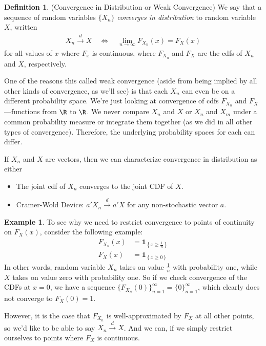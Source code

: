 \documentclass[12pt]{article}
\theoremstyle{plain}
\theoremstyle{definition}
\newtheorem{defn}[thm]{Definition}
\newtheorem{ex}[thm]{Example}
\theoremstyle{remark}
\newcommand{\one}[1]{\mathbf{1}_{#1}}
\newcommand{\dto}{\xrightarrow{d}}
\newcommand{\limn}{\lim_{n\rightarrow\infty}}
\begin{document}
\begin{defn}{(Convergence in Distribution or Weak Convergence)}
\label{defn:convergeInDistribution}
We say that a sequence of random variables $\{X_n\}$
\emph{converges in distribution} to random variable $X$, written
\begin{align*}
  X_n\dto X
  \quad\iff\quad
  \limn F_{X_n}(x) = F_X(x)
\end{align*}
for all values of $x$ where $F_x$ is continuous,
where $F_{X_n}$ and $F_X$ are the cdfs of $X_n$ and $X$, respectively.

One of the reasons this called weak convergence (aside from being
implied by all other kinds of convergence, as we'll see) is that each
$X_n$ can even be on a different probability space. We're just looking
at convergence of cdfs $F_{X_n}$ and $F_X$---functions from $\R$ to
$\R$.  We never compare $X_n$ and $X$ or $X_n$ and $X_m$ under a common
probability measure or integrate them together (as we did in all other
types of convergence). Therefore, the underlying probability spaces for
each can differ.

If $X_n$ and $X$ are vectors, then we can characterize convergence
in distribution as either
\begin{itemize}
  \item The joint cdf of $X_n$ converges to the joint CDF of $X$.
  \item Cramer-Wold Device: $a'X_n \dto a'X$ for any non-stochastic
    vector $a$.
\end{itemize}
\end{defn}
\begin{ex}
To see why we need to restrict convergence to points of continuity on
$F_X(x)$, consider the following example:
\begin{align*}
  F_{X_n}(x) &= \one{\left\{x\geq \frac{1}{n}\right\}}\\
  F_{X}(x) &= \one{\left\{x\geq 0\right\}}
\end{align*} In other words, random variable $X_n$ takes on value
$\frac{1}{n}$ with probability one, while $X$ takes on value zero with
probability one.  So if we check convergence of the CDFs at $x=0$, we
have a sequence $\{F_{X_n}(0)\}_{n=1}^\infty=\{0\}_{n=1}^\infty$, which
clearly does not converge to $F_X(0)=1$.

However, it is the case that $F_{X_n}$ is well-approximated by $F_X$ at
all other points, so we'd like to be able to say $X_n\dto X$. And we
can, if we simply restrict ourselves to points where $F_X$ is
continuous.
\end{ex}
\end{document}
